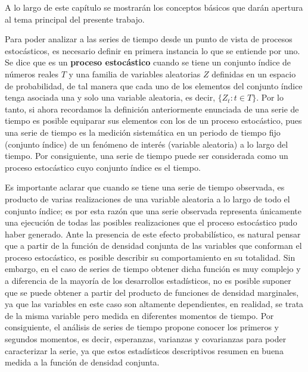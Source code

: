 A lo largo de este capítulo se mostrarán los conceptos básicos que darán apertura al tema principal del presente trabajo.\newline

Para poder analizar a las series de tiempo desde un punto de vista de procesos estocásticos, es necesario definir en primera instancia lo que se entiende por uno. Se dice que es un \textbf{proceso estocástico} cuando se tiene un conjunto índice de números reales $T$ y una familia de variables aleatorias $Z$ definidas en un espacio de probabilidad, de tal manera que cada uno de los elementos del conjunto índice tenga asociada una y solo una variable aleatoria, es decir,  $\{Z_t: t \in T\}$. Por lo tanto, si ahora recordamos la definición anteriormente enunciada de una serie de tiempo es posible equiparar sus elementos con los de un proceso estocástico, pues una serie de tiempo es la medición sistemática en un periodo de tiempo fijo (conjunto índice) de un fenómeno de interés (variable aleatoria) a lo largo del tiempo. Por consiguiente, una serie de tiempo puede ser considerada como un  proceso estocástico cuyo conjunto índice es el tiempo.\newline


Es importante aclarar que cuando se tiene una serie de tiempo observada, es producto de varias realizaciones de una variable aleatoria a lo largo de todo el conjunto índice; es por esta razón que una serie observada representa únicamente una ejecución de todas las posibles realizaciones que el proceso estocástico pudo haber generado. Ante la presencia de este efecto probabilístico, es natural pensar que a partir de la función de densidad conjunta de las variables que conforman el proceso estocástico, es posible describir su comportamiento en su totalidad. Sin embargo, en el caso de series de tiempo obtener dicha función es muy complejo y a diferencia de la mayoría de los desarrollos estadísticos, no es posible suponer que se puede obtener a partir del producto de funciones de densidad marginales, ya que las variables en este caso son altamente dependientes, en realidad, se trata de la misma variable pero medida en diferentes momentos de tiempo. Por consiguiente, el análisis de series de tiempo propone conocer los primeros y segundos momentos, es decir, esperanzas, varianzas y covarianzas para poder caracterizar la serie, ya que estos estadísticos descriptivos resumen en buena medida a la función de densidad conjunta.\newline

